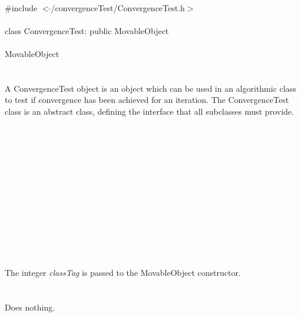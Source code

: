 
   \\
\indent \#include $<\tilde{}$/convergenceTest/ConvergenceTest.h$>$  \\

  \\
\indent class ConvergenceTest: public MovableObject  \\

 \\
\indent MovableObject \\
\indent{} \\

  \\
\indent A ConvergenceTest object is an object which can be used in an
algorithmic class to test if convergence has been achieved for an 
iteration. The ConvergenceTest class is an abstract class, defining
the interface that all subclasses must provide. \\

 \\
\indent{}  \\ 
\indent{}  \\ \\
\indent{}  \\ 
\indent{} \\ \\
\indent{}  \\ 
\indent{} \\
\indent{} \\
\indent{} \\

  \\
  \\
The integer {\em classTag} is passed to the MovableObject constructor. \\

 \\
 \\ 
Does nothing. \\

